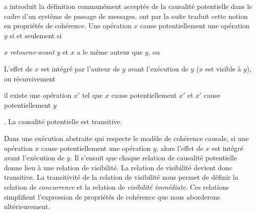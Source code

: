 \textcite{lamport_1978_time} a introduit la définition communément acceptée de la causalité potentielle dans le cadre d'un système de passage de messages.
\textcite{hutto_1990_causal} ont par la suite traduit cette notion en propriétés de cohérence.
Une opération $x$ cause potentiellement une opération $y$ si et seulement si \begin{inlinelist}
    \item $x$ \emph{retourne-avant} $y$ et $x$ a le même auteur que $y$, ou
    \item L'effet de $x$ est intégré par l'auteur de $y$ avant l'exécution de $y$ ($x$ est visible à $y$), ou récursivement
    \item il existe une opération $x'$ tel que $x$ cause potentiellement $x'$ et $x'$ cause potentiellement $y$
\end{inlinelist}.
La causalité potentielle est transitive.

Dans une exécution abstraite qui respecte le modèle de cohérence causale, si une opération $x$ cause potentiellement une opération $y$, alors l'effet de $x$ est intégré avant l'exécution de $y$.
Il s'ensuit que chaque relation de causalité potentielle donne lieu à une relation de visibilité.
La relation de visibilité devient donc transitive.
La transitivité de la relation de visibilité nous permet de définir la relation de \emph{concurrence} et la relation de \emph{visibilité immédiate}.
Ces relations simplifient l'expression de propriétés de cohérence que nous aborderons ultérieurement.

